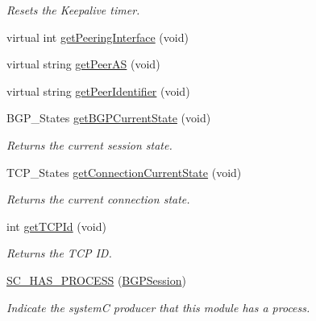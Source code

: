 \begin{DoxyCompactItemize}
\begin{DoxyCompactList}\small\item\em Resets the Keepalive timer. \end{DoxyCompactList}\item 
virtual int \hyperlink{classBGPSession_ad345c132ce5db5334b4c921fd745e642}{get\-Peering\-Interface} (void)
\item 
virtual string \hyperlink{classBGPSession_a663501b455c010d12e4cf1ff182e0355}{get\-Peer\-A\-S} (void)
\item 
virtual string \hyperlink{classBGPSession_ad74f8f645e0a99fcc115c3062985004f}{get\-Peer\-Identifier} (void)
\item 
B\-G\-P\-\_\-\-States \hyperlink{classBGPSession_a776c32ae58c02933a22ee23652d315da}{get\-B\-G\-P\-Current\-State} (void)
\begin{DoxyCompactList}\small\item\em Returns the current session state. \end{DoxyCompactList}\item 
T\-C\-P\-\_\-\-States \hyperlink{classBGPSession_ad636d249ffd53aa7a46bfcdf5091f9aa}{get\-Connection\-Current\-State} (void)
\begin{DoxyCompactList}\small\item\em Returns the current connection state. \end{DoxyCompactList}\item 
int \hyperlink{classBGPSession_a8110431fc392eff7efc7d5ab3a2a515d}{get\-T\-C\-P\-Id} (void)
\begin{DoxyCompactList}\small\item\em Returns the T\-C\-P I\-D. \end{DoxyCompactList}\item 
\hyperlink{classBGPSession_a112395018621c85ac62b43a2bcae211b}{S\-C\-\_\-\-H\-A\-S\-\_\-\-P\-R\-O\-C\-E\-S\-S} (\hyperlink{classBGPSession}{B\-G\-P\-Session})
\begin{DoxyCompactList}\small\item\em Indicate the system\-C producer that this module has a process. \end{DoxyCompactList}\end{DoxyCompactItemize}
